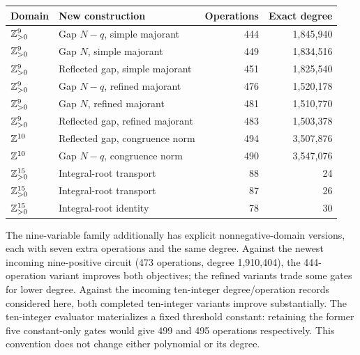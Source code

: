 \begin{center}
\begin{tabular}{llrr}
\toprule
Domain & New construction & Operations & Exact degree\\
\midrule
$\mathbb Z_{>0}^9$ & Gap $N-q$, simple majorant & 444 & 1,845,940\\
$\mathbb Z_{>0}^9$ & Gap $N$, simple majorant & 449 & 1,834,516\\
$\mathbb Z_{>0}^9$ & Reflected gap, simple majorant & 451 & 1,825,540\\
$\mathbb Z_{>0}^9$ & Gap $N-q$, refined majorant & 476 & 1,520,178\\
$\mathbb Z_{>0}^9$ & Gap $N$, refined majorant & 481 & 1,510,770\\
$\mathbb Z_{>0}^9$ & Reflected gap, refined majorant & 483 & 1,503,378\\
$\mathbb Z^{10}$ & Reflected gap, congruence norm & 494 & 3,507,876\\
$\mathbb Z^{10}$ & Gap $N-q$, congruence norm & 490 & 3,547,076\\
$\mathbb Z_{>0}^{15}$ & Integral-root transport & 88 & 24\\
$\mathbb Z_{>0}^{15}$ & Integral-root transport & 87 & 26\\
$\mathbb Z_{>0}^{15}$ & Integral-root identity & 78 & 30\\
\bottomrule
\end{tabular}
\end{center}
The nine-variable family additionally has explicit nonnegative-domain versions, each with seven extra operations and the same degree. Against the newest incoming nine-positive circuit (473 operations, degree 1,910,404), the 444-operation variant improves both objectives; the refined variants trade some gates for lower degree. Against the incoming ten-integer degree/operation records considered here, both completed ten-integer variants improve substantially. The ten-integer evaluator materializes a fixed threshold constant: retaining the former five constant-only gates would give 499 and 495 operations respectively. This convention does not change either polynomial or its degree.
